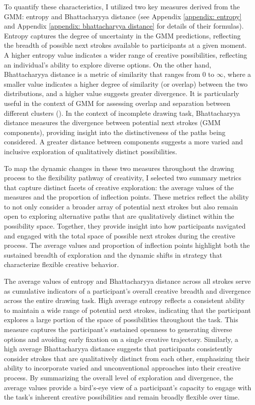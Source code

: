 \documentclass[../MA_Thesis.tex]{subfiles}
\begin{document}
To quantify these characteristics, I utilized two key measures derived from the GMM: entropy and Bhattacharyya distance (see Appendix \ref{appendix: entropy} and Appendix \ref{appendix: bhattacharyya distance} for details of their formulas). Entropy captures the degree of uncertainty in the GMM predictions, reflecting the breadth of possible next strokes available to participants at a given moment. A higher entropy value indicates a wider range of creative possibilities, reflecting an individual's ability to explore diverse options. On the other hand, Bhattacharyya distance is a metric of similarity that ranges from 0 to $\infty$, where a smaller value indicates a higher degree of similarity (or overlap) between the two distributions, and a higher value suggests greater divergence. It is particularly useful in the context of GMM for assessing overlap and separation between different clusters (\cite{alangari_intrinsically_2023}). In the context of incomplete drawing task, Bhattacharyya distance measures the divergence between potential next strokes (GMM components), providing insight into the distinctiveness of the paths being considered. A greater distance between components suggests a more varied and inclusive exploration of qualitatively distinct possibilities.

To map the dynamic changes in these two measures throughout the drawing process to the flexibility pathway of creativity, I selected two summary metrics that capture distinct facets of creative exploration: the average values of the measures and the proportion of inflection points. These metrics reflect the ability to not only consider a broader array of potential next strokes but also remain open to exploring alternative paths that are qualitatively distinct within the possibility space. Together, they provide insight into how participants navigated and engaged with the total space of possible next strokes during the creative process. The average values and proportion of inflection points highlight both the sustained breadth of exploration and the dynamic shifts in strategy that characterize flexible creative behavior. 

The average values of entropy and Bhattacharyya distance across all strokes serve as cumulative indicators of a participant’s overall creative breadth and divergence across the entire drawing task. High average entropy reflects a consistent ability to maintain a wide range of potential next strokes, indicating that the participant explores a large portion of the space of possibilities throughout the task. This measure captures the participant’s sustained openness to generating diverse options and avoiding early fixation on a single creative trajectory. Similarly, a high average Bhattacharyya distance suggests that participants consistently consider strokes that are qualitatively distinct from each other, emphasizing their ability to incorporate varied and unconventional approaches into their creative process. By summarizing the overall level of exploration and divergence, the average values provide a bird’s-eye view of a participant’s capacity to engage with the task’s inherent creative possibilities and remain broadly flexible over time.
\end{document}
